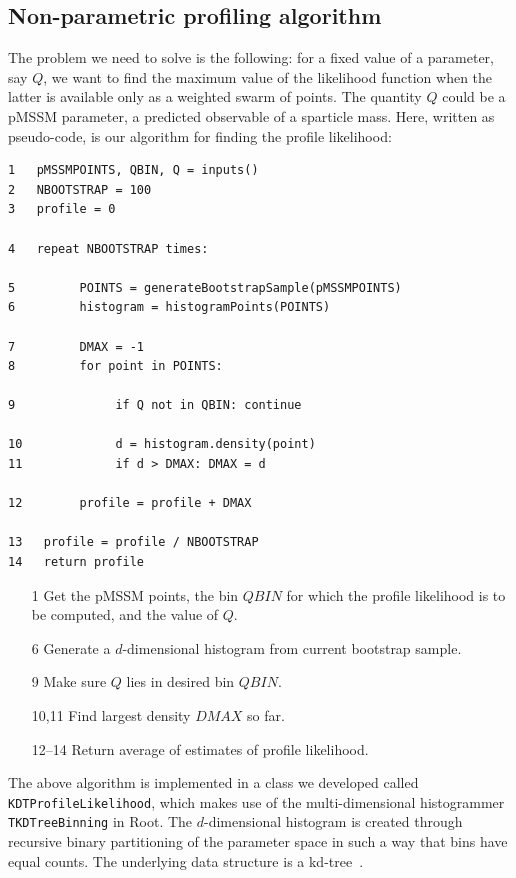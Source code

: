 \subsection*{Non-parametric profiling algorithm}
The problem we need to solve is the following: for a fixed value of a parameter, say $Q$, we want to find 
the maximum value of the likelihood function when the latter is available only as a weighted swarm of points. The quantity $Q$ could be a pMSSM parameter, a predicted observable of a 
sparticle mass. Here, written as pseudo-code, is our algorithm for finding the profile likelihood:
\begin{verbatim}
1	pMSSMPOINTS, QBIN, Q = inputs()
2	NBOOTSTRAP = 100
3	profile = 0

4	repeat NBOOTSTRAP times:
	      
5	      POINTS = generateBootstrapSample(pMSSMPOINTS)
6	      histogram = histogramPoints(POINTS)
	
7	      DMAX = -1
8	      for point in POINTS:
	      
9	           if Q not in QBIN: continue
	      
10	           d = histogram.density(point)	      
11	           if d > DMAX: DMAX = d
	 
12	      profile = profile + DMAX
	        
13	 profile = profile / NBOOTSTRAP	 
14	 return profile	      
\end{verbatim}
\begin{itemize}
	\item[1] Get the pMSSM points, the bin $QBIN$ for which the profile likelihood
	is to be computed, and the value of $Q$.
	
	\item[6] Generate a $d$-dimensional histogram from current bootstrap sample.
	
	\item[9] Make sure $Q$ lies in desired bin $QBIN$.
	
	\item[10,11] Find largest density $DMAX$ so far.
	
	\item[12--14] Return average of estimates of profile likelihood.
\end{itemize}
The above algorithm is implemented in a class we developed called {\tt KDTProfileLikelihood}, which
makes use of the multi-dimensional histogrammer {\tt TKDTreeBinning} in Root.
The $d$-dimensional histogram is created through recursive binary partitioning of the parameter
space in such a way that bins have equal counts. The underlying data structure is 
a kd-tree~\cite{TKDTreeBinning}.

